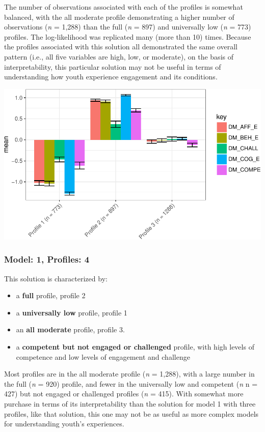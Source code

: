 \documentclass[]{msu-thesis}
\providecommand{\tightlist}{%
  \setlength{\itemsep}{0pt}\setlength{\parskip}{0pt}}
\theoremstyle{definition}
\theoremstyle{definition}
\theoremstyle{definition}
\theoremstyle{remark}
\begin{document}
The number of observations associated with each of the profiles is
somewhat balanced, with the all moderate profile demonstrating a higher
number of observations (\emph{n} = 1,288) than the full (\emph{n} = 897)
and universally low (\emph{n} = 773) profiles. The log-likelihood was
replicated many (more than 10) times. Because the profiles associated
with this solution all demonstrated the same overall pattern (i.e., all
five variables are high, low, or moderate), on the basis of
interpretability, this particular solution may not be useful in terms of
understanding how youth experience engagement and its conditions.

\begin{center}\includegraphics[width=0.8\linewidth]{rosenberg-dissertation_files/figure-latex/m1_3p-1} \end{center}

\subsubsection{Model: 1, Profiles: 4}\label{model-1-profiles-4}

This solution is characterized by:

\begin{itemize}
\tightlist
\item
  a \textbf{full} profile, profile 2
\item
  a \textbf{universally low} profile, profile 1
\item
  an \textbf{all moderate} profile, profile 3.
\item
  a \textbf{competent but not engaged or challenged} profile, with high
  levels of competence and low levels of engagement and challenge
\end{itemize}

Most profiles are in the all moderate profile (\emph{n} = 1,288), with a
large number in the full (\emph{n} = 920) profile, and fewer in the
universally low and competent (\emph{n} n = 427) but not engaged or
challenged profiles (\emph{n} = 415). With somewhat more purchase in
terms of its interpretability than the solution for model 1 with three
profiles, like that solution, this one may not be as useful as more
complex models for understanding youth's experiences.
\end{document}
